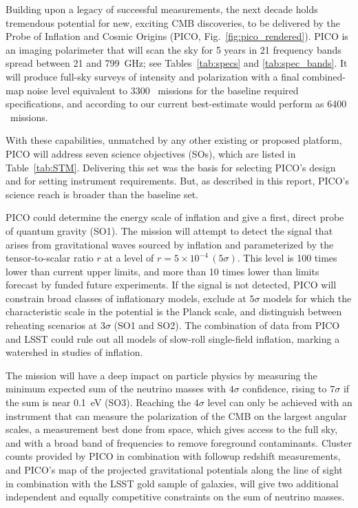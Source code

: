 \documentclass[PICOReport.tex]{subfiles}
\begin{document}
Building upon a legacy of successful measurements, the next decade holds tremendous potential for new, exciting \ac{CMB} discoveries, to be delivered by the Probe of Inflation and Cosmic Origins (PICO, Fig.~\ref{fig:pico_rendered}). PICO is an imaging polarimeter that will scan the sky for 5 years in 21 frequency bands spread between 21 and 799~GHz; see Tables~\ref{tab:specs} and \ref{tab:spec_bands}. It will produce %
full-sky surveys of intensity and polarization with a final combined-map noise level equivalent to 3300 \planck\ missions for the baseline required specifications, and according to our current best-estimate would perform as 6400 \planck\ missions.  

With these capabilities, unmatched by any other existing or proposed platform, PICO will address seven science objectives (SOs), which are listed in Table~\ref{tab:STM}. Delivering this set was the basis for selecting PICO's design and for setting instrument requirements. But, as described in this report, PICO's science reach is broader than the baseline set. 

PICO could determine the energy scale of inflation and give a first, direct probe of quantum gravity (SO1). %
The mission will attempt to detect the signal that arises from gravitational waves sourced by inflation and parameterized by the tensor-to-scalar ratio $r$ at a level of $r =5\times10^{-4} \, (5\sigma)$. This level is 100 times lower than current upper limits, and more than 10 times lower than limits forecast by funded future experiments.  If the signal is not detected, PICO will constrain broad classes of inflationary models, exclude at $5 \sigma$ models for which the characteristic scale in the potential is the Planck scale, and distinguish between reheating scenarios at $3\sigma$ (SO1 and SO2). The combination of data from PICO and LSST could rule out all models of slow-roll single-field inflation, marking a watershed in studies of inflation. 


The mission will have a deep impact on particle physics by measuring the minimum expected sum of the neutrino masses with $4\sigma$ confidence, rising to $7\sigma$ if the sum is near 0.1~eV (SO3). Reaching the $4\sigma$ level can only be achieved with an instrument that can measure the polarization of the CMB on the largest angular scales, a measurement best done from space, which gives access to the full sky, and with a broad band of frequencies to remove foreground contaminants.  
Cluster counts provided by PICO in combination with followup redshift measurements, and PICO's map of the projected gravitational potentials along the line of sight in combination with the LSST gold sample of galaxies, will give two additional independent and equally competitive constraints on the sum of neutrino masses. 
\end{document}
